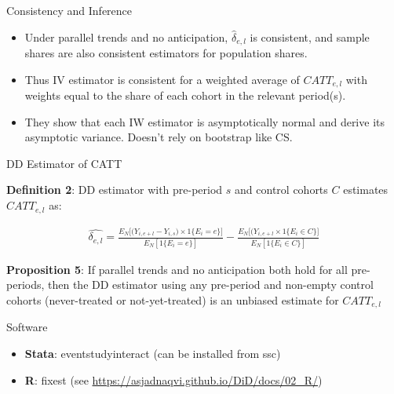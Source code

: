 \documentclass{beamer}
\begin{document}
\begin{frame}{Consistency and Inference}


\begin{itemize}
\item Under parallel trends and no anticipation, $\widehat{\delta}_{e,l}$ is consistent, and sample shares are also consistent estimators for population shares. 
\item Thus IV estimator is consistent for a weighted average of $CATT_{e,l}$ with weights equal to the share of each cohort in the relevant period(s).
\item They show that each IW estimator is asymptotically normal and derive its asymptotic variance. Doesn't rely on bootstrap like CS.
\end{itemize}

\end{frame}

\begin{frame}{DD Estimator of CATT}

\textbf{Definition 2}: DD estimator with pre-period $s$ and control cohorts $C$ estimates $CATT_{e,l}$ as:

\begin{eqnarray*}
\widehat{\delta_{e,l}} = \frac{ E_N \big [ \big ( Y_{i, e+l} - Y_{i,s} \big ) \times 1\{E_i=e\} \big ]}{E_N[1 \{E_i=e\} ]} - \frac{E_N \big [ \big ( Y_{i,e+l} \times 1 \{E_i \in C \} ]}{E_N [1 \{ E_i \in C \}]}
\end{eqnarray*}


\textbf{Proposition 5}: If parallel trends and no anticipation both hold for all pre-periods, then the DD estimator using any pre-period and non-empty control cohorts (never-treated or not-yet-treated) is an unbiased estimate for $CATT_{e,l}$

\end{frame}

\begin{frame}{Software}

\begin{itemize}
\item \textbf{Stata}: eventstudyinteract (can be installed from ssc)
\item \textbf{R}: fixest (see \url{https://asjadnaqvi.github.io/DiD/docs/02_R/})
\end{itemize}


\end{frame}
\end{document}

